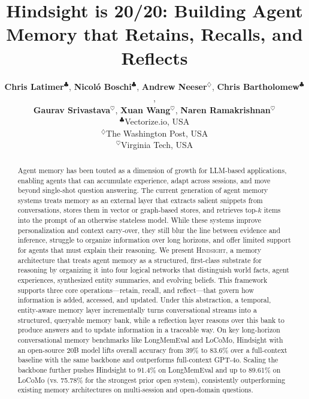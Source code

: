 \documentclass{article} %
\title{Hindsight is 20/20: Building Agent Memory that Retains, Recalls, and Reflects}
\author{
\vspace{1em}
\hspace{-0.5em}
\textbf{Chris Latimer}$^{\clubsuit}$,
\textbf{Nicoló Boschi}$^{\clubsuit}$,
\textbf{Andrew Neeser}$^{\diamondsuit}$,
\textbf{Chris Bartholomew}$^{\clubsuit}$,\\[-1em]
\textbf{Gaurav Srivastava}$^{\heartsuit}$,
\textbf{Xuan Wang}$^{\heartsuit}$,
\textbf{Naren Ramakrishnan}$^{\heartsuit}$
\\[0.75em]
$^{\clubsuit}$Vectorize.io, USA \\
$^{\diamondsuit}$The Washington Post, USA \\
$^{\heartsuit}$Virginia Tech, USA
\\[0.75em]
}
\theoremstyle{plain}
\theoremstyle{definition}
\newcommand{\our}{\textsc{Hindsight}\xspace}
\newcommand{\hindsight}{\textsc{Hindsight}\xspace}
\begin{document}
\maketitle

\begin{abstract}
Agent memory has been touted as a dimension of growth for LLM-based applications, enabling agents that can accumulate experience, adapt across sessions, and move beyond single-shot question answering.
The current generation of agent memory systems treats memory as an external layer that extracts salient snippets from conversations, stores them in vector or graph-based stores, and retrieves top-$k$ items into the prompt of an otherwise stateless model.
While these systems improve personalization and context carry-over, they still blur the line between evidence and inference, struggle to organize information over long horizons, and offer limited support for agents that must explain their reasoning.
We present \hindsight, a memory architecture that treats agent memory as a structured, first-class substrate for reasoning by organizing it into four logical networks that distinguish world facts, agent experiences, synthesized entity summaries, and evolving beliefs.
This framework supports three core operations---retain, recall, and reflect---that govern how information is added, accessed, and updated.
Under this abstraction, a temporal, entity-aware memory layer incrementally turns conversational streams into a structured, queryable memory bank, while a reflection layer reasons over this bank to produce answers and to update information in a traceable way.
On key long-horizon conversational memory benchmarks like LongMemEval and LoCoMo, Hindsight with an open-source 20B model lifts overall accuracy from 39\% to 83.6\% over a full-context baseline with the same backbone and outperforms full-context GPT-4o. Scaling the backbone further pushes Hindsight to 91.4\% on LongMemEval and up to 89.61\% on LoCoMo (vs. 75.78\% for the strongest prior open system), consistently outperforming existing memory architectures on multi-session and open-domain questions.
\end{abstract}
\end{document}

